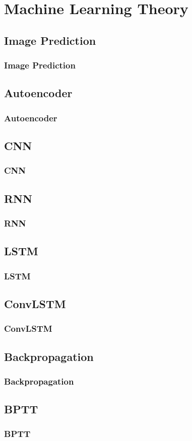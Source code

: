 \section{Machine Learning Theory}
 \subsection{Image Prediction}
  \begin{frame}
   \frametitle{Image Prediction}
   
  \end{frame}
 
 \subsection{Autoencoder}
  \begin{frame}
   \frametitle{Autoencoder}
  
  \end{frame}
 
 \subsection{CNN}
  \begin{frame}
   \frametitle{CNN}

  \end{frame}
 
 \subsection{RNN}
  \begin{frame}
   \frametitle{RNN}
   
  \end{frame}
 
 \subsection{LSTM}
  \begin{frame}
   \frametitle{LSTM}
   
  \end{frame}
 
 \subsection{ConvLSTM}
  \begin{frame}
   \frametitle{ConvLSTM}
   
  \end{frame}
 
 \subsection{Backpropagation}
  \begin{frame}
   \frametitle{Backpropagation}
   
  \end{frame}

 \subsection{BPTT}
  \begin{frame}
   \frametitle{BPTT}
   
  \end{frame}  
